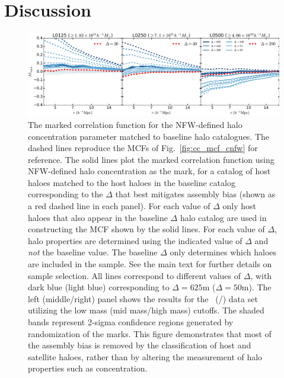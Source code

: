 \documentclass[usenatbib,fleqn]{mnras}
\begin{document}
\section{Discussion}
\label{section:discussion}

\begin{figure}
	\centering
	\includegraphics[width=\textwidth]{match_mcf_cNFW.pdf}
	\caption{The marked correlation function for the NFW-defined halo concentration parameter matched to baseline halo catalogues. The dashed lines reproduce the MCFs of Fig.~\ref{fig:cc_mcf_cnfw} for reference. The solid lines plot the marked correlation function using NFW-defined halo concentration as the mark, for a catalog of host haloes matched to the host haloes in the baseline catalog corresponding to the $\Delta$ that best mitigates assembly bias (shown as a red dashed line in each panel). For each value of $\Delta$ only host haloes that also appear in the baseline $\Delta$ halo catalog are used in constructing the MCF shown by the solid lines. For each value of $\Delta$, halo properties are determined using the indicated value of $\Delta$ and {\em not} the baseline value. The baseline $\Delta$ only determines which haloes are included in the sample. See the main text for further details on sample selection. All lines correspond to different values of $\Delta$, with dark blue (light blue) corresponding to $\Delta = 625$m ($\Delta = 50$m). The left (middle/right) panel shows the results for the \simA \ (\simB /\simC) data set utilizing the low mass (mid mass/high mass) cutoffs. The shaded bands represent 2-sigma confidence regions generated by randomization of the marks. This figure demonstrates that most of the assembly bias is removed by the classification of host and satellite haloes, rather than by altering the measurement of halo properties such as concentration. 
\label{fig:hvm_mcf_cnfw}
}
\end{figure}
\end{document}
